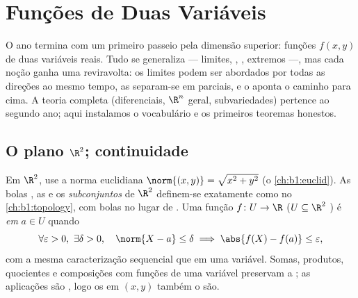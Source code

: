 \chapter{Funções de Duas Variáveis}\label{ch:b1:multivar}

O ano termina com um primeiro passeio pela dimensão superior: funções
$f(x, y)$ de duas variáveis reais. Tudo se generaliza --- limites,
, , extremos ---, mas cada noção ganha uma
reviravolta: os limites podem ser abordados por todas as direções ao
mesmo tempo, as  separam-se em parciais, e o  aponta
o caminho para cima. A teoria completa (diferenciais, $\R^n$ geral,
subvariedades) pertence ao segundo ano; aqui instalamos o vocabulário
e os primeiros teoremas honestos.

\section{O plano $\R^2$; continuidade}

\begin{definition}\label{def:b1:multivar:topology}
Em $\R^2$, use a norma euclidiana $\norm{(x,y)} = \sqrt{x^2 + y^2}$ (o \cref{ch:b1:euclid}). As bolas ,
as  e os \emph{subconjuntos } de $\R^2$ definem-se
exatamente como no \cref{ch:b1:topology}, com bolas no lugar de . Uma função
$f \colon U \to \R$ ($U \subseteq \R^2$ ) é \emph{ em} $a \in U$ quando
\[
\forall\varepsilon > 0,\ \exists\delta > 0, \quad
\norm{X - a} \leq \delta \implies \abs{f(X) - f(a)} \leq
\varepsilon,
\]
com a mesma caracterização sequencial que em uma variável. Somas,
produtos, quocientes e composições com funções  de uma
variável preservam a ; as aplicações  são
, logo os  em $(x,y)$ também o são.
\end{definition}

